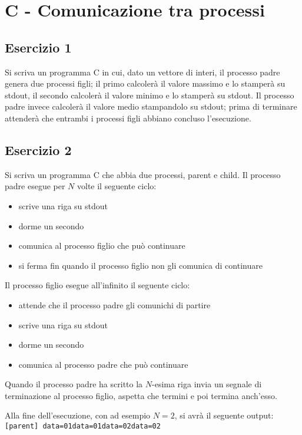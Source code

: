 \documentclass{article}
\def\code#1{\texttt{#1}}
\begin{document}
\section*{C - Comunicazione tra processi}
\subsection*{Esercizio 1}
Si scriva un programma C in cui, dato un vettore di interi, il processo padre genera due processi figli; il primo calcolerà il valore massimo e lo stamperà su stdout, il secondo calcolerà il valore minimo e lo stamperà su stdout. Il processo padre invece calcolerà il valore medio stampandolo su stdout; prima di terminare attenderà che entrambi i processi figli abbiano concluso l'esecuzione.

\subsection*{Esercizio 2}
Si scriva un programma C che abbia due processi, parent e child. Il processo padre esegue per $N$ volte il seguente ciclo:
\begin{itemize}
    \item scrive una riga su stdout
    \item dorme un secondo
    \item comunica al processo figlio che può continuare
    \item si ferma fin quando il processo figlio non gli comunica di continuare
\end{itemize}
Il processo figlio esegue all'infinito il seguente ciclo:
\begin{itemize}
    \item attende che il processo padre gli comunichi di partire
    \item scrive una riga su stdout
    \item dorme un secondo
    \item comunica al processo padre che può continuare
\end{itemize}
Quando il processo padre ha scritto la $N$-esima riga invia un segnale di terminazione al processo figlio, aspetta che termini e poi termina anch'esso.
 
Alla fine dell'esecuzione, con ad esempio $N = 2$, si avrà il seguente output:\newline
\code{[parent] data=01\newline[child ] data=01\newline[parent] data=02\newline[child ] data=02\newline}
\end{document}
